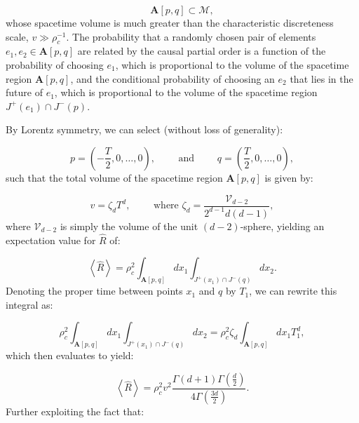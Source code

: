 \documentclass{article}
\begin{document}
\begin{equation}
\mathbf{A} \left[ p, q \right] \subset \mathcal{M},
\end{equation}
whose spacetime volume is much greater than the characteristic discreteness scale, ${v \gg \rho_{c}^{-1}}$. The probability that a randomly chosen pair of elements ${e_1, e_2 \in \mathbf{A} \left[ p, q \right]}$ are related by the causal partial order is a function of the probability of choosing ${e_1}$, which is proportional to the volume of the spacetime region ${\mathbf{A} \left[ p, q \right]}$, and the conditional probability of choosing an ${e_2}$ that lies in the future of ${e_1}$, which is proportional to the volume of the spacetime region ${J^{+} \left( e_1 \right) \cap J^{-} \left( p \right)}$.

By Lorentz symmetry, we can select (without loss of generality):

\begin{equation}
p = \left( - \frac{T}{2}, 0, \dots, 0 \right), \qquad \text{ and } \qquad q = \left( \frac{T}{2}, 0, \dots, 0 \right),
\end{equation}
such that the total volume of the spacetime region ${\mathbf{A} \left[ p, q \right]}$ is given by:

\begin{equation}
v = \zeta_d T^d, \qquad \text{ where } \zeta_d = \frac{\mathcal{V}_{d - 2}}{2^{d - 1} d \left( d - 1 \right)},
\end{equation}
where ${\mathcal{V}_{d - 2}}$ is simply the volume of the unit ${\left( d - 2 \right)}$-sphere, yielding an expectation value for ${\hat{R}}$ of:

\begin{equation}
\left\langle \hat{R} \right\rangle = \rho_{c}^{2} \int_{\mathbf{A} \left[ p, q \right]} d x_1 \int_{J^{+} \left( x_1 \right) \cap J^{-} \left( q \right)} d x_2.
\end{equation}
Denoting the proper time between points ${x_1}$ and $q$ by ${T_1}$, we can rewrite this integral as:

\begin{equation}
\rho_{c}^{2} \int_{\mathbf{A} \left[ p, q \right]} d x_1 \int_{J^{+} \left( x_1 \right) \cap J^{-} \left( q \right)} d x_2 = \rho_{c}^{2} \zeta_d \int_{\mathbf{A} \left[ p, q \right]} d x_1 T_{1}^{d},
\end{equation}
which then evaluates to yield:

\begin{equation}
\left\langle \hat{R} \right\rangle = \rho_{c}^{2} v^2 \frac{\Gamma \left( d + 1 \right) \Gamma \left( \frac{d}{2} \right)}{4 \Gamma \left( \frac{3 d}{2} \right)}.
\end{equation}
Further exploiting the fact that:
\end{document}
